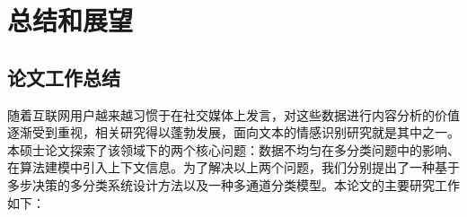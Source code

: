 \chapter{总结和展望}
\label{cha:conclusion}

\section{论文工作总结}

随着互联网用户越来越习惯于在社交媒体上发言，对这些数据进行内容分析的价值逐渐受到重视，相关研究得以蓬勃发展，面向文本的情感识别研究就是其中之一。本硕士论文探索了该领域下的两个核心问题：数据不均匀在多分类问题中的影响、在算法建模中引入上下文信息。为了解决以上两个问题，我们分别提出了一种基于多步决策的多分类系统设计方法以及一种多通道分类模型。本论文的主要研究工作如下：

